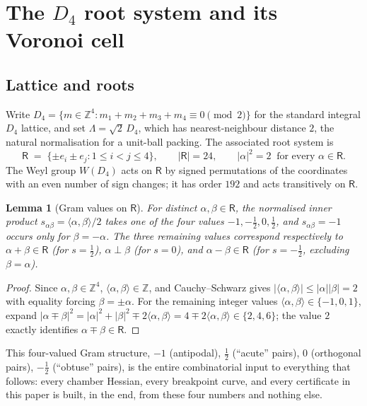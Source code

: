 \documentclass[11pt,reqno]{amsart}
\renewcommand{\_}{\origunderscore\allowbreak}
\numberwithin{equation}{section}
\theoremstyle{plain}
\newtheorem{lem}[thm]{Lemma}
\theoremstyle{definition}
\theoremstyle{remark}
\newcommand{\Rt}{\mathsf{R}}                 %
\newcommand{\Latt}{\Lambda}                  %
\begin{document}
\section{The \texorpdfstring{$D_4$}{D4} root system and its Voronoi cell}\label{sec:root-system}

\subsection{Lattice and roots}

Write $D_4=\{m\in\mathbb{Z}^4 : m_1+m_2+m_3+m_4\equiv0\pmod2\}$ for the
standard integral $D_4$ lattice, and set $\Latt=\sqrt2\,D_4$, which has
nearest-neighbour distance $2$, the natural normalisation for a
unit-ball packing. The associated root system is
\[
  \Rt \;=\; \{\pm e_i \pm e_j : 1\le i<j\le4\}, \qquad
  |\Rt|=24, \qquad |\alpha|^2=2 \ \text{ for every } \alpha\in\Rt.
\]
The Weyl group $W(D_4)$ acts on $\Rt$ by signed permutations of the
coordinates with an even number of sign changes; it has order $192$ and
acts transitively on $\Rt$.

\begin{lem}[Gram values on $\Rt$]\label{lem:gram-new}
For distinct $\alpha,\beta\in\Rt$, the normalised inner product
$s_{\alpha\beta}=\langle\alpha,\beta\rangle/2$ takes one of the four
values $-1,-\tfrac12,0,\tfrac12$, and $s_{\alpha\beta}=-1$ occurs only
for $\beta=-\alpha$. The three remaining values correspond respectively
to $\alpha+\beta\in\Rt$ (for $s=\tfrac12$), $\alpha\perp\beta$ (for
$s=0$), and $\alpha-\beta\in\Rt$ (for $s=-\tfrac12$, excluding
$\beta=\alpha$).
\end{lem}

\begin{proof}
Since $\alpha,\beta\in\mathbb{Z}^4$, $\langle\alpha,\beta\rangle\in\mathbb{Z}$,
and Cauchy--Schwarz gives $|\langle\alpha,\beta\rangle|\le|\alpha||\beta|=2$
with equality forcing $\beta=\pm\alpha$. For the remaining integer values
$\langle\alpha,\beta\rangle\in\{-1,0,1\}$, expand
$|\alpha\mp\beta|^2=|\alpha|^2+|\beta|^2\mp2\langle\alpha,\beta\rangle
=4\mp2\langle\alpha,\beta\rangle\in\{2,4,6\}$; the value $2$ exactly
identifies $\alpha\mp\beta\in\Rt$.
\end{proof}

This four-valued Gram structure, $-1$ (antipodal), $\tfrac12$
(``acute'' pairs), $0$ (orthogonal pairs), $-\tfrac12$ (``obtuse''
pairs), is the entire combinatorial input to everything that follows:
every chamber Hessian, every breakpoint curve, and every certificate in this paper is built, in the end, from these four numbers and nothing
else.
\end{document}
